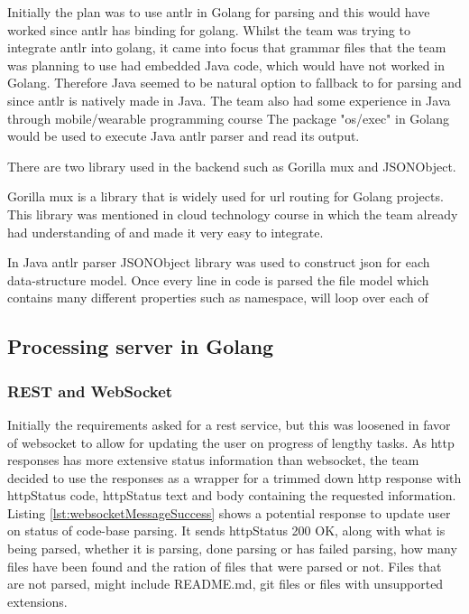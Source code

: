 Initially the plan was to use \gls{antlr} in Golang for parsing and this would have worked since \gls{antlr} has binding for golang. Whilst the team was trying to integrate \gls{antlr} into golang, it came into focus that grammar files that the team was planning to use had embedded Java code, which would have not worked in Golang. Therefore Java seemed to be natural option to fallback to for parsing and since \gls{antlr} is natively made in Java. The team also had some experience in Java through mobile/wearable programming course \cite{course:mobileWearable} The package "os/exec" in Golang would be used to execute Java \gls{antlr} parser and read its output.

There are two library used in the \gls{backend} such as Gorilla mux and JSONObject.

Gorilla mux is a library that is widely used for \gls{url} routing for Golang projects. This library was mentioned in cloud technology course \cite{course:cloud} in which the team already had understanding of and made it very easy to integrate. 

In Java \gls{antlr} parser JSONObject library was used to construct \gls{json} for each data-structure model. Once every line in code is parsed the file model which contains many different properties such as namespace, will loop over each of
 



\subsection{Processing server in Golang}

\subsubsection{REST and WebSocket}

Initially the requirements asked for a \gls{rest} service, but this was loosened in favor of \gls{websocket} to allow for updating the user on progress of lengthy tasks. As \gls{http} responses has more extensive status information than \gls{websocket}, the team decided to use the responses as a wrapper for a trimmed down \gls{http} response with \gls{http}Status code, \gls{http}Status text and body containing the requested information. Listing \ref{lst:websocketMessageSuccess} shows a potential response to update user on status of code-base parsing. It sends \gls{http}Status 200 OK, along with what is being parsed, whether it is parsing, done parsing or has failed parsing, how many files have been found and the ration of files that were parsed or not. Files that are not parsed, might include README.md, \gls{git} files or files with unsupported extensions.  

